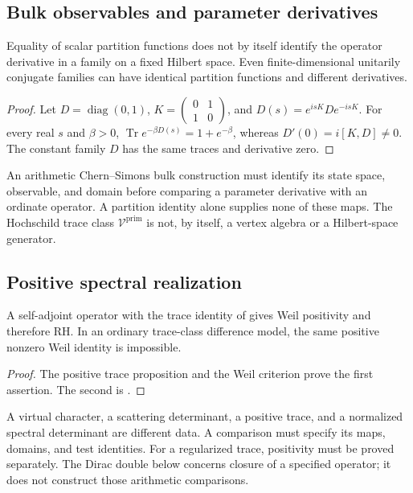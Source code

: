 \subsection{Bulk observables and parameter derivatives}
\label{v4-arith:w9-r4:placement:acs}
\begin{proposition}
\label{v4-arith:w9-r4:prop:spectral-flow-eq-acs}
Equality of scalar partition functions does not by itself
identify the operator derivative in a family on a fixed Hilbert
space. Even finite-dimensional unitarily conjugate families can
have identical partition functions and different derivatives.
\end{proposition}
\begin{proof}
Let \(D=\operatorname{diag}(0,1)\),
\(K=\left(\begin{smallmatrix}0&1\\1&0\end{smallmatrix}\right)\),
and \(D(s)=e^{isK}De^{-isK}\).
For every real \(s\) and \(\beta>0\),
\(\operatorname{Tr}e^{-\beta D(s)}=1+e^{-\beta}\),
whereas \(D'(0)=i[K,D]\ne0\). The constant family \(D\)
has the same traces and derivative zero.
\end{proof}
\begin{remark}
\label{v4-arith:w9-r4:rem:acs-wilson}
An arithmetic Chern--Simons bulk construction must identify its
state space, observable, and domain before comparing a parameter
derivative with an ordinate operator. A partition identity alone
supplies none of these maps. The Hochschild trace class
\(\mathcal V^{\mathrm{prim}}\) is not, by itself, a vertex algebra or
a Hilbert-space generator.
\end{remark}

\subsection{Positive spectral realization}
\label{v4-arith:w9-r4:placement:unified}
\begin{theorem}
\label{v4-arith:w9-r4:thm:unified-residual}
A self-adjoint operator with the trace identity of
 gives Weil positivity
and therefore RH. In an ordinary trace-class difference model,
the same positive nonzero Weil identity is impossible.
\end{theorem}
\begin{proof}
The positive trace proposition and the Weil criterion prove the
first assertion. The second is
.
\end{proof}
\begin{remark}
\label{v4-arith:w9-r4:rem:honest-summary}
A virtual character, a scattering determinant, a positive trace,
and a normalized spectral determinant are different data.
A comparison must specify its maps, domains, and test identities.
For a regularized trace, positivity must be proved separately.
The Dirac double below concerns closure of a specified operator;
it does not construct those arithmetic comparisons.
\end{remark}

